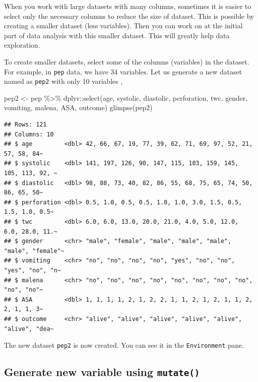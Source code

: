 \documentclass[
  10pt,
]{krantz}
\newenvironment{Shaded}{\begin{snugshade}}{\end{snugshade}}
\newcommand{\FunctionTok}[1]{\textcolor[rgb]{0.00,0.00,0.00}{#1}}
\newcommand{\NormalTok}[1]{#1}
\newcommand{\OtherTok}[1]{\textcolor[rgb]{0.56,0.35,0.01}{#1}}
\newcommand{\SpecialCharTok}[1]{\textcolor[rgb]{0.00,0.00,0.00}{#1}}
\begin{document}
When you work with large datasets with many columns, sometimes it is easier to select only the necessary columns to reduce the size of dataset. This is possible by creating a smaller dataset (less variables). Then you can work on at the initial part of data analysis with this smaller dataset. This will greatly help data exploration.

To create smaller datasets, select some of the columns (variables) in the dataset. For example, in \texttt{pep} data, we have 34 variables. Let us generate a new dataset named as \texttt{pep2} with only 10 variables ,

\begin{Shaded}
\begin{Highlighting}[]
\NormalTok{pep2 }\OtherTok{\textless{}{-}}\NormalTok{ pep }\SpecialCharTok{\%\textgreater{}\%}\NormalTok{ dplyr}\SpecialCharTok{::}\FunctionTok{select}\NormalTok{(age, systolic, diastolic, perforation, twc,}
\NormalTok{                              gender, vomiting, malena, ASA, outcome)}
\FunctionTok{glimpse}\NormalTok{(pep2)}
\end{Highlighting}
\end{Shaded}

\begin{verbatim}
## Rows: 121
## Columns: 10
## $ age         <dbl> 42, 66, 67, 19, 77, 39, 62, 71, 69, 97, 52, 21, 57, 58, 84~
## $ systolic    <dbl> 141, 197, 126, 90, 147, 115, 103, 159, 145, 105, 113, 92, ~
## $ diastolic   <dbl> 98, 88, 73, 40, 82, 86, 55, 68, 75, 65, 74, 50, 86, 65, 50~
## $ perforation <dbl> 0.5, 1.0, 0.5, 0.5, 1.0, 1.0, 3.0, 1.5, 0.5, 1.5, 1.0, 0.5~
## $ twc         <dbl> 6.0, 6.0, 13.0, 20.0, 21.0, 4.0, 5.0, 12.0, 6.0, 28.0, 11.~
## $ gender      <chr> "male", "female", "male", "male", "male", "male", "female"~
## $ vomiting    <chr> "no", "no", "no", "no", "yes", "no", "no", "yes", "no", "n~
## $ malena      <chr> "no", "no", "no", "no", "no", "no", "no", "no", "no", "no"~
## $ ASA         <dbl> 1, 1, 1, 1, 2, 1, 2, 2, 1, 1, 2, 1, 2, 1, 1, 2, 2, 1, 1, 3~
## $ outcome     <chr> "alive", "alive", "alive", "alive", "alive", "alive", "dea~
\end{verbatim}

The new dataset \texttt{pep2} is now created. You can see it in the \texttt{Environment} pane.

\hypertarget{generate-new-variable-using-mutate}{%
\subsection{\texorpdfstring{Generate new variable using \texttt{mutate()}}{Generate new variable using mutate()}}\label{generate-new-variable-using-mutate}}
\end{document}
